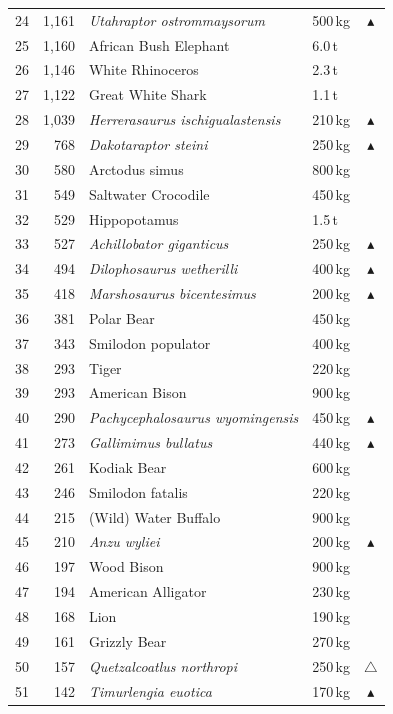 \documentclass[11pt]{article}
\begin{document}
\begin{longtable}{rrllc}
24 & 1,161 & \textit{Utahraptor ostrommaysorum} & 500\,kg & $\blacktriangle$ \\
25 & 1,160 & African Bush Elephant & 6.0\,t &  \\
26 & 1,146 & White Rhinoceros & 2.3\,t &  \\
27 & 1,122 & Great White Shark & 1.1\,t &  \\
28 & 1,039 & \textit{Herrerasaurus ischigualastensis} & 210\,kg & $\blacktriangle$ \\
29 & 768 & \textit{Dakotaraptor steini} & 250\,kg & $\blacktriangle$ \\
30 & 580 & Arctodus simus & 800\,kg &  \\
31 & 549 & Saltwater Crocodile & 450\,kg &  \\
32 & 529 & Hippopotamus & 1.5\,t &  \\
33 & 527 & \textit{Achillobator giganticus} & 250\,kg & $\blacktriangle$ \\
34 & 494 & \textit{Dilophosaurus wetherilli} & 400\,kg & $\blacktriangle$ \\
35 & 418 & \textit{Marshosaurus bicentesimus} & 200\,kg & $\blacktriangle$ \\
36 & 381 & Polar Bear & 450\,kg &  \\
37 & 343 & Smilodon populator & 400\,kg &  \\
38 & 293 & Tiger & 220\,kg &  \\
39 & 293 & American Bison & 900\,kg &  \\
40 & 290 & \textit{Pachycephalosaurus wyomingensis} & 450\,kg & $\blacktriangle$ \\
41 & 273 & \textit{Gallimimus bullatus} & 440\,kg & $\blacktriangle$ \\
42 & 261 & Kodiak Bear & 600\,kg &  \\
43 & 246 & Smilodon fatalis & 220\,kg &  \\
44 & 215 & (Wild) Water Buffalo & 900\,kg &  \\
45 & 210 & \textit{Anzu wyliei} & 200\,kg & $\blacktriangle$ \\
46 & 197 & Wood Bison & 900\,kg &  \\
47 & 194 & American Alligator & 230\,kg &  \\
48 & 168 & Lion & 190\,kg &  \\
49 & 161 & Grizzly Bear & 270\,kg &  \\
50 & 157 & \textit{Quetzalcoatlus northropi} & 250\,kg & $\triangle$ \\
51 & 142 & \textit{Timurlengia euotica} & 170\,kg & $\blacktriangle$ \\

\end{longtable}
\end{document}
